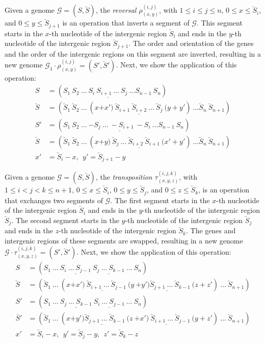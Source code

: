 \documentclass[12pt]{article}
\begin{document}
Given a genome $\mathcal{G} = (S,\breve{S})$, the \emph{reversal} $\rho^{(i,j)}_{(x,y)}$, with $1 \le i \le j \le n$, $0 \le x \le \breve{S}_{i}$, and $0 \le y \le \breve{S}_{j+1}$ is an operation that inverts a segment of $\mathcal{G}$. This segment starts in the $x$-th nucleotide of the intergenic region $\breve{S}_i$ and ends in the $y$-th nucleotide of the intergenic region $\breve{S}_{j+1}$. The order and orientation of the genes and the order of the intergenic regions on this segment are inverted, resulting in a new genome $\mathcal{G}_1 \cdot \rho^{(i,j)}_{(x,y)} = (S',\breve{S}')$. Next, we show the application of this operation:
\begin{align*}
    S &= (S_1~S_2~\ldots~\underline{S_i~S_{i+1}~\ldots~S_j}~\ldots S_{n-1}~S_n)\\
    \breve{S} &= (\breve{S}_1~\breve{S}_2~\ldots~(x\underline{+x')~\breve{S}_{i+1}~\breve{S}_{i+2}~\ldots~\breve{S}_j~(y+}y')~\ldots \breve{S}_{n}~\breve{S}_{n+1})\\
    S' &= (S_1~S_2~\ldots~\underline{-S_j~\ldots~-S_{i+1}~-S_i}~\ldots S_{n-1}~S_n)\\
    \breve{S} &= (\breve{S}_1~\breve{S}_2~\ldots~(x\underline{+y)~\breve{S}_{j}~\ldots~\breve{S}_{i+2}~\breve{S}_{i+1}~(x'+}y')~\ldots \breve{S}_{n}~\breve{S}_{n+1})\\
    x'&= \breve{S}_i - x,~~ y' = \breve{S}_{j+1} - y
\end{align*}

Given a genome $\mathcal{G} = (S,\breve{S})$, the \emph{transposition} $\tau^{(i,j,k)}_{(x,y,z)}$, with $1 \le i < j < k \le n+1$, $0 \le x \le \breve{S}_{i}$, $0 \le y \le \breve{S}_{j}$, and $0 \le z \le \breve{S}_{k}$, is an operation that exchanges two segments of $\mathcal{G}$. The first segment starts in the $x$-th nucleotide of the intergenic region $\breve{S}_i$ and ends in the $y$-th nucleotide of the intergenic region $\breve{S}_j$. The second segment starts in the $y$-th nucleotide of the intergenic region $\breve{S}_j$ and ends in the $z$-th nucleotide of the intergenic region $\breve{S}_k$. The genes and intergenic regions of these segments are swapped, resulting in a new genome $\mathcal{G} \cdot \tau^{(i,j,k)}_{(x,y,z)} = (S',\breve{S}')$. Next, we show the application of this operation:
\begin{align*}
    S &= (S_1~\ldots~\underline{S_i~\ldots~S_{j-1}}~\underline{S_j~\ldots~S_{k-1}}~\ldots~S_n)\\
    \breve{S} &= (\breve{S}_1~\ldots~(x\underline{+x')~\breve{S}_{i+1}~\ldots~\breve{S}_{j-1}~(y}~\underline{+y')\breve{S}_{j+1}~\ldots~\breve{S}_{k-1}~(z}+z')~\ldots~\breve{S}_{n+1})\\
    S' &= (S_1~\ldots~\underline{S_j~\ldots~S_{k-1}}~\underline{S_i~\ldots~S_{j-1}}~\ldots~S_n)\\
    \breve{S'} &= (\breve{S}_1~\ldots~(x\underline{+y')\breve{S}_{j+1}~\ldots~\breve{S}_{k-1}~(z}~\underline{+x')~\breve{S}_{i+1}~\ldots~\breve{S}_{j-1}~(y}+z')~\ldots~\breve{S}_{n+1})\\
    x'&= \breve{S}_i - x,~~ y' = \breve{S}_j - y,~~ z' = \breve{S}_k - z
\end{align*}
\end{document}
